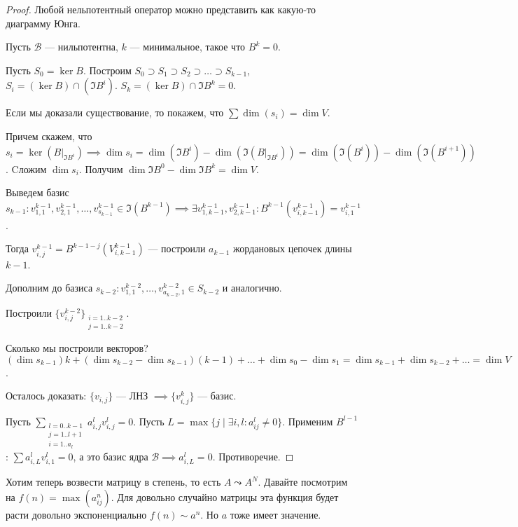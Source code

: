 \begin{proof}
    Любой нельпотентный оператор можно представить как какую-то диаграмму Юнга. 

    Пусть $\mathcal{B}$ --- нильпотентна,  $k$ --- минимальное, такое что  $B^k = 0$. 

    Пусть  $S_0 = \ker B$. Построим  $S_0 \supset S_1 \supset S_2 \supset \ldots \supset S_{k-1}$, $S_i = (\ker B) \cap (\Im B^i)$. $S_k = (\ker B) \cap \Im B^k = 0$.
    
    Если мы доказали существование, то покажем, что  $\sum \dim (s_i) = \dim V$.

    Причем скажем, что $s_i = \ker(B \Big|_{\Im B^i}) \implies \dim s_i = \dim (\Im B^i) - \dim(\Im(B\Big|_{\Im B^i})) = \dim (\Im (B^i)) - \dim(\Im(B^{i+1}))$. Cложим  $\dim s_i$. Получим  $\dim \Im B^0 - \dim \Im B^k = \dim V$. 

    Выведем базис $s_{k-1}\!: v_{1,1}^{k-1}, v_{2, 1}^{k-1}, \ldots, v_{s_{k-1}}^{k-1} \in \Im(B^{k-1}) \implies \exists v_{1, k-1}^{k-1}, v_{2, k - 1}^{k-1}\!: B^{k-1} (v_{i, k - 1}^{k-1}) = v_{i, 1}^{k-1}$.

    Тогда $v_{i,j}^{k-1} = B^{k-1-j}(V_{i, k-1}^{k-1})$ --- построили  $a_{k-1}$ жордановых цепочек длины  $k-1$. 

    Дополним до базиса $s_{k-2}\!: v_{1,1}^{k-2}, \ldots, v_{a_{k-2}, 1}^{k-2} \in S_{k-2}$ и аналогично.

    Построили $\{v_{i, j}^{k-2}\}_{\substack{i=1..k-2\\j=1..k-2}}$. 

    Сколько мы построили векторов? $(\dim s_{k-1}) k + (\dim s_{k-2} - \dim s_{k-1})(k-1) + \ldots + \dim s_0 - \dim s_1 = \dim s_{k-1} + \dim s_{k-2} + \ldots = \dim V$.

    Осталось доказать: $\{v_{i, j}\}$ --- ЛНЗ  $\implies \{v_{i, j}^k\}$ --- базис.

    Пусть  $\sum_{\substack{l=0..k-1\\j=1..l+1\\i=1..a_l}} a_{i, j}^l v_{i, j}^l = 0$. Пусть  $L = \max\{j \mid \exists i, l\!: a_{ij}^l \neq 0\}$. Применим  $B^{l-1}$:  $\sum a_{i, L}^l v_{i, 1}^l = 0$, а это базис ядра  $\mathcal{B} \implies a_{i, L}^l = 0$. Противоречие. 
\end{proof}

Хотим теперь возвести матрицу в степень, то есть $A \leadsto A^N$. Давайте посмотрим на  $f(n) = \max(a_{ij}^n)$. Для довольно случайно матрицы эта функция будет расти довольно экспоненциально $f(n) \sim a^n$. Но $a$ тоже имеет значение.

